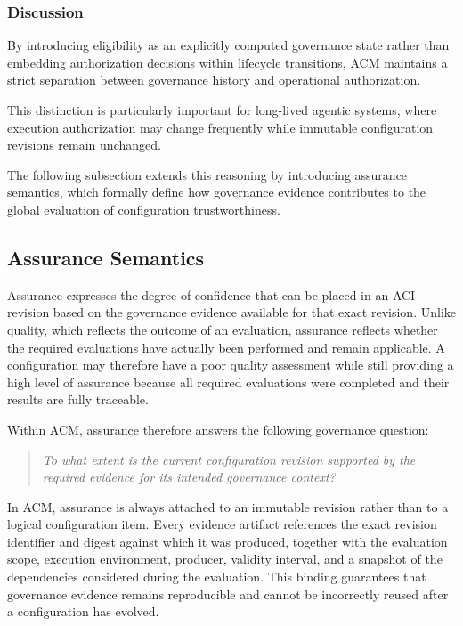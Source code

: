 \documentclass[10pt]{article}
\begin{document}
\subsubsection{Discussion}

By introducing eligibility as an explicitly computed governance state rather
than embedding authorization decisions within lifecycle transitions, ACM
maintains a strict separation between governance history and operational
authorization.

This distinction is particularly important for long-lived agentic systems,
where execution authorization may change frequently while immutable
configuration revisions remain unchanged.

The following subsection extends this reasoning by introducing assurance
semantics, which formally define how governance evidence contributes to the
global evaluation of configuration trustworthiness.

\subsection{Assurance Semantics}
\label{subsec:assurance_semantics}

Assurance expresses the degree of confidence that can be placed in an ACI revision based on the governance evidence available for that exact revision. Unlike quality, which reflects the outcome of an evaluation, assurance reflects whether the required evaluations have actually been performed and remain applicable. A configuration may therefore have a poor quality assessment while still providing a high level of assurance because all required evaluations were completed and their results are fully traceable. 

Within ACM, assurance therefore answers the following governance question:
\begin{quote}
	\emph{To what extent is the current configuration revision supported by the
		required evidence for its intended governance context?}
\end{quote}

In ACM, assurance is always attached to an immutable revision rather than to a logical configuration item. Every evidence artifact references the exact revision identifier and digest against which it was produced, together with the evaluation scope, execution environment, producer, validity interval, and a snapshot of the dependencies considered during the evaluation. This binding guarantees that governance evidence remains reproducible and cannot be incorrectly reused after a configuration has evolved.
\end{document}
